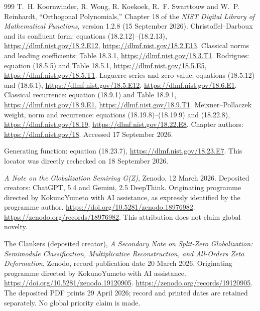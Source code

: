 \begin{thebibliography}{999}
T.~H. Koornwinder, R. Wong, R. Koekoek, R.~F. Swarttouw and
W.~P. Reinhardt,
``Orthogonal Polynomials,'' Chapter 18 of the
\emph{NIST Digital Library of Mathematical Functions},
version 1.2.8 (15 September 2026).
Christoffel--Darboux and its confluent form: equations (18.2.12)--(18.2.13),
\url{https://dlmf.nist.gov/18.2.E12},
\url{https://dlmf.nist.gov/18.2.E13}.
Classical norms and leading coefficients: Table 18.3.1,
\url{https://dlmf.nist.gov/18.3.T1}.
Rodrigues: equation (18.5.5) and Table 18.5.1,
\url{https://dlmf.nist.gov/18.5.E5},
\url{https://dlmf.nist.gov/18.5.T1}.
Laguerre series and zero value: equations (18.5.12) and (18.6.1),
\url{https://dlmf.nist.gov/18.5.E12},
\url{https://dlmf.nist.gov/18.6.E1}.
Classical recurrence: equation (18.9.1) and Table 18.9.1,
\url{https://dlmf.nist.gov/18.9.E1},
\url{https://dlmf.nist.gov/18.9.T1}.
Meixner--Pollaczek weight, norm and recurrence:
equations (18.19.8)--(18.19.9) and (18.22.8),
\url{https://dlmf.nist.gov/18.19},
\url{https://dlmf.nist.gov/18.22.E8}.
Chapter authors: \url{https://dlmf.nist.gov/18}.
Accessed 17 September 2026.


Generating function: equation (18.23.7),
\url{https://dlmf.nist.gov/18.23.E7}.
This locator was directly rechecked on 18 September 2026.

\emph{A Note on the Globalization Semiring G(Z)}, Zenodo,
12 March 2026. Deposited creators: ChatGPT, 5.4 and Gemini, 2.5 DeepThink.
Originating programme directed by KokunoYumeto with AI assistance,
as expressly identified by the programme author.
\url{https://doi.org/10.5281/zenodo.18976982}.
\url{https://zenodo.org/records/18976982}.
This attribution does not claim global novelty.

The Clankers (deposited creator), \emph{A Secondary Note on Split-Zero
Globalization: Semimodule Classification, Multiplicative Reconstruction,
and All-Orders Zeta Deformation}, Zenodo, record publication date
20 March 2026. Originating programme directed by KokunoYumeto
with AI assistance. \url{https://doi.org/10.5281/zenodo.19120905}.
\url{https://zenodo.org/records/19120905}.
The deposited PDF prints 29 April 2026; record and printed dates
are retained separately. No global priority claim is made.


\end{thebibliography}
